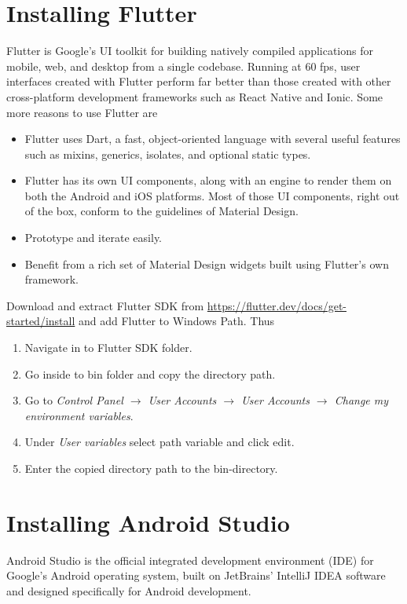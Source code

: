 \section{Installing Flutter}
Flutter is Google’s UI toolkit for building natively compiled applications for mobile, web, and desktop from a single codebase. Running at 60 fps, user interfaces created with Flutter perform far better than those created with other cross-platform development frameworks such as React Native and Ionic. Some more reasons to use Flutter are
\begin{itemize}
    \item Flutter uses Dart, a fast, object-oriented language with several useful features such as mixins, generics, isolates, and optional static types.
    \item Flutter has its own UI components, along with an engine to render them on both the Android and iOS platforms. Most of those UI components, right out of the box, conform to the guidelines of Material Design.
    \item Prototype and iterate easily.
    \item Benefit from a rich set of Material Design widgets built using Flutter’s own framework.
\end{itemize}

Download and extract Flutter SDK from \url{https://flutter.dev/docs/get-started/install} and add Flutter to Windows Path. Thus 
\begin{enumerate}
    \item Navigate in to Flutter SDK folder.
    \item Go inside to bin folder and copy  the directory path. 
    \item Go to \emph{Control Panel $\rightarrow$ User Accounts $\rightarrow$ User Accounts $\rightarrow$ Change my environment variables}.
    \item Under \emph{User variables} select path variable and click edit.
    \item Enter the copied directory path to the bin-directory.
\end{enumerate}

\section{Installing Android Studio}
Android Studio is the official integrated development environment (IDE) for Google's Android operating system, built on JetBrains' IntelliJ IDEA software and designed specifically for Android development.\par


